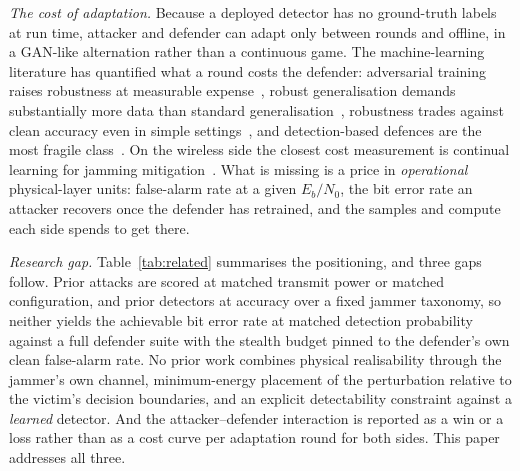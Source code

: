 \textit{The cost of adaptation.}
Because a deployed detector has no ground-truth labels at run time, attacker and defender can adapt only between rounds and offline, in a GAN-like alternation rather than a continuous game.
The machine-learning literature has quantified what a round costs the defender: adversarial training raises robustness at measurable expense~\cite{madry2018towards}, robust generalisation demands substantially more data than standard generalisation~\cite{schmidt2018adversarially}, robustness trades against clean accuracy even in simple settings~\cite{tsipras2019robustness}, and detection-based defences are the most fragile class~\cite{carlini2017detected,tramer2020adaptive}.
On the wireless side the closest cost measurement is continual learning for jamming mitigation~\cite{davaslioglu2024continual}.
What is missing is a price in \emph{operational} physical-layer units: false-alarm rate at a given $E_b/N_0$, the bit error rate an attacker recovers once the defender has retrained, and the samples and compute each side spends to get there.

\textit{Research gap.}
Table~\ref{tab:related} summarises the positioning, and three gaps follow.
Prior attacks are scored at matched transmit power or matched configuration, and prior detectors at accuracy over a fixed jammer taxonomy, so neither yields the achievable bit error rate at matched detection probability against a full defender suite with the stealth budget pinned to the defender's own clean false-alarm rate.
No prior work combines physical realisability through the jammer's own channel, minimum-energy placement of the perturbation relative to the victim's decision boundaries, and an explicit detectability constraint against a \emph{learned} detector.
And the attacker--defender interaction is reported as a win or a loss rather than as a cost curve per adaptation round for both sides.
This paper addresses all three.


